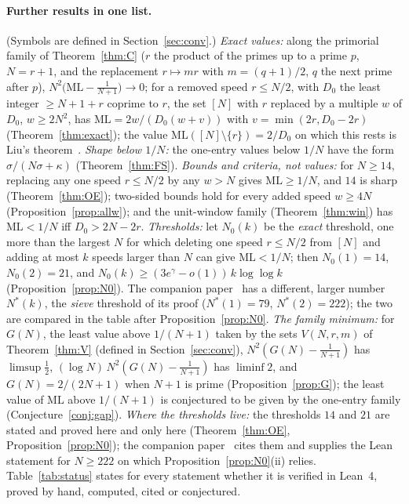 \documentclass[11pt]{article}
\theoremstyle{definition}
\theoremstyle{remark}
\newcommand{\ML}{\mathrm{ML}}
\begin{document}
\paragraph{Further results in one list.}
(Symbols are defined in Section~\ref{sec:conv}.) \emph{Exact values:} along the primorial family of Theorem~\ref{thm:C} ($r$ the product of the primes up to a prime $p$, $N=r+1$, and the replacement $r\mapsto mr$ with $m=(q+1)/2$, $q$ the next prime after $p$), $N^2\bigl(\ML-\frac1{N+1}\bigr)\to0$; for a removed speed $r\le N/2$, with $D_0$ the least integer $\ge N+1+r$ coprime to $r$, the set $[N]$ with $r$ replaced by a multiple $w$ of $D_0$, $w\ge2N^2$, has $\ML=2w/(D_0(w+v))$ with $v=\min(2r,D_0-2r)$ (Theorem~\ref{thm:exact}); the value $\ML([N]\setminus\{r\})=2/D_0$ on which this rests is Liu's theorem~\cite[Thm.~18]{L}. \emph{Shape below $1/N$:} the one-entry values below $1/N$ have the form $\sigma/(N\sigma+\kappa)$ (Theorem~\ref{thm:FS}). \emph{Bounds and criteria, not values:} for $N\ge14$, replacing any one speed $r\le N/2$ by any $w>N$ gives $\ML\ge1/N$, and $14$ is sharp (Theorem~\ref{thm:OE}); two-sided bounds hold for every added speed $w\ge4N$ (Proposition~\ref{prop:allw}); and the unit-window family (Theorem~\ref{thm:win}) has $\ML<1/N$ iff $D_0>2N-2r$. \emph{Thresholds:} let $N_0(k)$ be the \emph{exact} threshold, one more than the largest $N$ for which deleting one speed $r\le N/2$ from $[N]$ and adding at most $k$ speeds larger than $N$ can give $\ML<1/N$; then $N_0(1)=14$, $N_0(2)=21$, and $N_0(k)\ge(3e^{\gamma}-o(1))\,k\log\log k$ (Proposition~\ref{prop:N0}). The companion paper~\cite{B} has a different, larger number $N^*(k)$, the \emph{sieve} threshold of its proof ($N^*(1)=79$, $N^*(2)=222$); the two are compared in the table after Proposition~\ref{prop:N0}. \emph{The family minimum:} for $G(N)$, the least value above $1/(N+1)$ taken by the sets $V(N,r,m)$ of Theorem~\ref{thm:V} (defined in Section~\ref{sec:conv}), $N^2(G(N)-\frac1{N+1})$ has $\limsup\frac12$, $(\log N)\,N^2(G(N)-\frac1{N+1})$ has $\liminf2$, and $G(N)=2/(2N+1)$ when $N+1$ is prime (Proposition~\ref{prop:G}); the least value of $\ML$ above $1/(N+1)$ is conjectured to be given by the one-entry family (Conjecture~\ref{conj:gap}). \emph{Where the thresholds live:} the thresholds $14$ and $21$ are stated and proved here and only here (Theorem~\ref{thm:OE}, Proposition~\ref{prop:N0}); the companion paper~\cite{B} cites them and supplies the Lean statement for $N\ge222$ on which Proposition~\ref{prop:N0}(ii) relies. Table~\ref{tab:status} states for every statement whether it is verified in Lean~4, proved by hand, computed, cited or conjectured.
\end{document}
